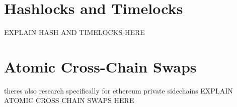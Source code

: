 \clearpage

\section{Hashlocks and Timelocks}
\label{sec:background:third_section}
EXPLAIN HASH AND TIMELOCKS HERE


\section{Atomic Cross-Chain Swaps}
\label{sec:background:fifth_section}

theres also research specifically for ethereum private sidechains \cite{robinson2019atomic}
EXPLAIN ATOMIC CROSS CHAIN SWAPS HERE
\cite{herlihy2018atomic}